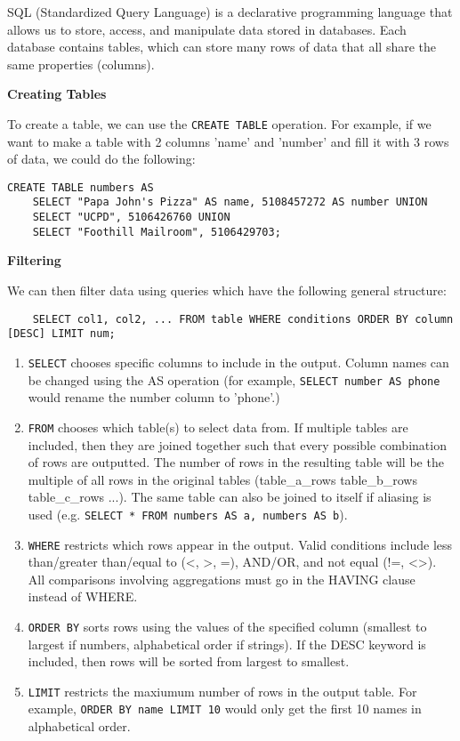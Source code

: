 SQL (Standardized Query Language) is a declarative programming language that allows us to store, access, and manipulate data stored in databases.
Each database contains tables, which can store many rows of data that all share the same properties (columns). 


\textbf{Creating Tables}

To create a table, we can use the \texttt{CREATE TABLE} operation. For example, if we want to make a table with 2 columns 'name' and 'number' and fill it with 3 rows of data, we could do the following:
\newline

\begin{lstlisting}
CREATE TABLE numbers AS
    SELECT "Papa John's Pizza" AS name, 5108457272 AS number UNION
    SELECT "UCPD", 5106426760 UNION
    SELECT "Foothill Mailroom", 5106429703;
\end{lstlisting}

\textbf{Filtering}

We can then filter data using queries which have the following general structure:
\begin{lstlisting}
    SELECT col1, col2, ... FROM table WHERE conditions ORDER BY column [DESC] LIMIT num;
\end{lstlisting}
\begin{enumerate}
    \item \texttt{SELECT} chooses specific columns to include in the output. Column names can be changed using the AS operation (for example, \texttt{SELECT number AS phone} would rename the number column to 'phone'.)
    \item \texttt{FROM} chooses which table(s) to select data from. If multiple tables are included, then they are joined together such that every possible combination of rows are outputted. The number of rows in the resulting table will be the multiple of all rows in the original tables (table\_a\_rows \* table\_b\_rows \* table\_c\_rows \* ...). The same table can also be joined to itself if aliasing is used (e.g. \texttt{SELECT * FROM numbers AS a, numbers AS b}).
    \item \texttt{WHERE} restricts which rows appear in the output. Valid conditions include less than/greater than/equal to (\textless, \textgreater, =), AND/OR, and not equal (!=, \textless\textgreater). All comparisons involving aggregations must go in the HAVING clause instead of WHERE.
    \item \texttt{ORDER BY} sorts rows using the values of the specified column (smallest to largest if numbers, alphabetical order if strings). If the DESC keyword is included, then rows will be sorted from largest to smallest.
    \item \texttt{LIMIT} restricts the maxiumum number of rows in the output table. For example, \texttt{ORDER BY name LIMIT 10} would only get the first 10 names in alphabetical order.
\end{enumerate}

